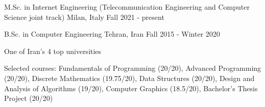 

\begin{cventries}


  \cventry
    {M.Sc. in Internet Engineering (Telecommunication Engineering and Computer Science joint track)} %
    {} %
    {Milan, Italy} %
    {Fall 2021 - present} %
    {
    }

  \cventry
    {B.Sc. in Computer Engineering} %
    {} %
    {Tehran, Iran} %
    {Fall 2015 - Winter 2020} %
    {
      \begin{cvitems} %
      \item {
      	One of Iran's 4 top universities
      }
        \item {Selected courses: Fundamentals of Programming (20/20), Advanced Programming (20/20), Discrete Mathematics (19.75/20), \newline Data Structures (20/20), Design and Analysis of Algorithms (19/20), Computer Graphics (18.5/20), Bachelor's Thesis Project (20/20)}
      \end{cvitems}
    }


\end{cventries}
